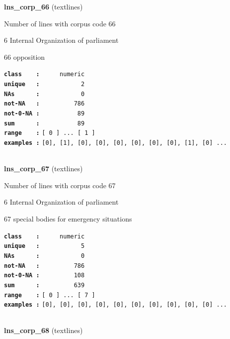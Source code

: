 \documentclass[]{article}
\begin{document}
\textbf{lns\_corp\_66} (textlines)

Number of lines with corpus code 66

6 Internal Organization of parliament

66 opposition

\textbf{\texttt{class\ \ \ \ :}} \texttt{~~~~~numeric}\\
\textbf{\texttt{unique\ \ \ :}} \texttt{~~~~~~~~~~~2}\\
\textbf{\texttt{NAs\ \ \ \ \ \ :}} \texttt{~~~~~~~~~~~0}\\
\textbf{\texttt{not-NA\ \ \ :}} \texttt{~~~~~~~~~786}\\
\textbf{\texttt{not-0-NA\ :}} \texttt{~~~~~~~~~~89}\\
\textbf{\texttt{sum\ \ \ \ \ \ :}} \texttt{~~~~~~~~~~89}\\
\textbf{\texttt{range\ \ \ \ :}}
\texttt{{[}\ 0\ {]}\ ...\ {[}\ 1\ {]}}\\
\textbf{\texttt{examples\ :}}
\texttt{{[}0{]},\ {[}1{]},\ {[}0{]},\ {[}0{]},\ {[}0{]},\ {[}0{]},\ {[}0{]},\ {[}0{]},\ {[}1{]},\ {[}0{]}\ ...}\\

~

\textbf{lns\_corp\_67} (textlines)

Number of lines with corpus code 67

6 Internal Organization of parliament

67 special bodies for emergency situations

\textbf{\texttt{class\ \ \ \ :}} \texttt{~~~~~numeric}\\
\textbf{\texttt{unique\ \ \ :}} \texttt{~~~~~~~~~~~5}\\
\textbf{\texttt{NAs\ \ \ \ \ \ :}} \texttt{~~~~~~~~~~~0}\\
\textbf{\texttt{not-NA\ \ \ :}} \texttt{~~~~~~~~~786}\\
\textbf{\texttt{not-0-NA\ :}} \texttt{~~~~~~~~~108}\\
\textbf{\texttt{sum\ \ \ \ \ \ :}} \texttt{~~~~~~~~~639}\\
\textbf{\texttt{range\ \ \ \ :}}
\texttt{{[}\ 0\ {]}\ ...\ {[}\ 7\ {]}}\\
\textbf{\texttt{examples\ :}}
\texttt{{[}0{]},\ {[}0{]},\ {[}0{]},\ {[}0{]},\ {[}0{]},\ {[}0{]},\ {[}0{]},\ {[}0{]},\ {[}0{]},\ {[}0{]}\ ...}\\

~

\textbf{lns\_corp\_68} (textlines)
\end{document}

